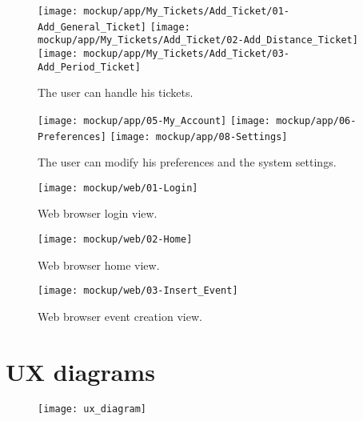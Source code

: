 	\begin{figure}[H]
		\texttt{[image: mockup/app/My\_Tickets/Add\_Ticket/01-Add\_General\_Ticket]}
		\hspace{.3cm}
		\texttt{[image: mockup/app/My\_Tickets/Add\_Ticket/02-Add\_Distance\_Ticket]}
		\hspace{.3cm}
		\texttt{[image: mockup/app/My\_Tickets/Add\_Ticket/03-Add\_Period\_Ticket]}
		\centering 
		\caption{The user can handle his tickets.}
	\end{figure}
	
	\begin{figure}[H]
		\texttt{[image: mockup/app/05-My\_Account]}
		\hspace{.3cm}
		\texttt{[image: mockup/app/06-Preferences]}
		\hspace{.3cm}
		\texttt{[image: mockup/app/08-Settings]}
		\centering 
		\caption{The user can modify his preferences and the system settings.}
	\end{figure}
	
	\begin{figure}[H]
		\texttt{[image: mockup/web/01-Login]}
		\centering
		\caption{Web browser login view.}
	\end{figure}
	\begin{figure}[H]
		\texttt{[image: mockup/web/02-Home]}
		\centering
		\caption{Web browser home view.}
	\end{figure}
	\begin{figure}[H]
		\texttt{[image: mockup/web/03-Insert\_Event]}
		\centering
		\caption{Web browser event creation view.}
	\end{figure}

\section{UX diagrams}
\label{subsect:UX diagrams}

	\begin{figure}[H]
		\texttt{[image: ux\_diagram]}
		\centering
	\end{figure}